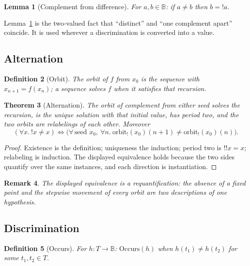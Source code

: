 \documentclass[11pt]{article}
\newtheorem{theorem}{Theorem}[section]
\newtheorem{definition}[theorem]{Definition}
\newtheorem{lemma}[theorem]{Lemma}
\newtheorem{remark}[theorem]{Remark}
\newcommand{\Occurs}{\mathrm{Occurs}}
\newcommand{\B}{\mathbb{B}}
\begin{document}
\begin{lemma}[Complement from difference]
\label{lem:neeqnot}
For $a, b \in \B$: if $a \neq b$ then $b = !a$.
\end{lemma}

Lemma~\ref{lem:neeqnot} is the two-valued fact that ``distinct'' and ``one complement apart'' coincide. It is used wherever a discrimination is converted into a value.

\subsection{Alternation}

\begin{definition}[Orbit]
\label{def:orbit}
The orbit of $f$ from $x_0$ is the sequence with $x_{n+1} = f(x_n)$; a sequence \emph{solves} $f$ when it satisfies that recursion.
\end{definition}

\begin{theorem}[Alternation]
\label{thm:becoming}
The orbit of complement from either seed solves the recursion, is the unique solution with that initial value, has period two, and the two orbits are relabelings of each other. Moreover
\[
(\forall x.\ !x \neq x) \iff \bigl(\forall\, \text{seed } x_0,\ \forall n.\ \mathrm{orbit}_{!}(x_0)(n{+}1) \neq \mathrm{orbit}_{!}(x_0)(n)\bigr).
\]
\end{theorem}

\begin{proof}
Existence is the definition; uniqueness the induction; period two is $!!x = x$; relabeling is induction. The displayed equivalence holds because the two sides quantify over the same instances, and each direction is instantiation.
\end{proof}

\begin{remark}
The displayed equivalence is a requantification: the absence of a fixed point and the stepwise movement of every orbit are two descriptions of one hypothesis.
\end{remark}

\subsection{Discrimination}
\label{sec:discrimination}

\begin{definition}[Occurs]
\label{def:occurs}
For $h : T \to \B$: $\Occurs(h)$ when $h(t_1) \neq h(t_2)$ for some $t_1, t_2 \in T$.
\end{definition}
\end{document}
